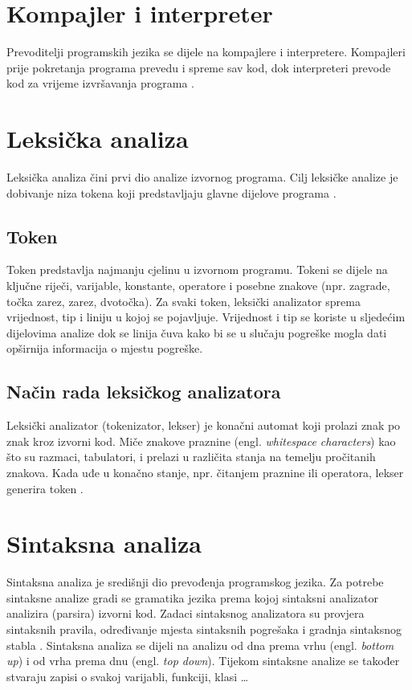 \documentclass[times, utf8, zavrsni]{fer}
\begin{document}
\section{Kompajler i interpreter}
Prevoditelji programskih jezika se dijele na kompajlere i interpretere. Kompajleri prije pokretanja programa prevedu i spreme sav kod, dok interpreteri 
prevode kod za vrijeme izvršavanja programa \citep{compilerint}. 

\section{Leksička analiza}
Leksička analiza čini prvi dio analize izvornog programa. Cilj leksičke analize je dobivanje niza tokena koji predstavljaju glavne dijelove programa \citep{ppj}. 

\subsection{Token}
Token predstavlja najmanju cjelinu u izvornom programu. Tokeni se dijele na ključne riječi, varijable, konstante, operatore i posebne znakove (npr. zagrade, točka zarez, zarez, dvotočka).
Za svaki token, leksički analizator sprema vrijednost, tip i liniju u kojoj se pojavljuje. Vrijednost i tip se koriste u sljedećim dijelovima analize dok se linija čuva kako bi se u slučaju pogreške mogla
dati opširnija informacija o mjestu pogreške.

\subsection{Način rada leksičkog analizatora}
Leksički analizator (tokenizator, lekser) je konačni automat koji prolazi znak po znak kroz izvorni kod. Miče znakove praznine (engl. \textit{whitespace characters}) kao što su razmaci,
tabulatori, i prelazi u različita stanja na temelju pročitanih znakova.
Kada uđe u konačno stanje, npr. čitanjem praznine ili operatora, lekser generira token \citep{ppj}. 

\section{Sintaksna analiza}
Sintaksna analiza je središnji dio prevođenja programskog jezika. Za potrebe sintaksne analize gradi se gramatika jezika prema kojoj sintaksni analizator analizira (parsira) izvorni kod.
Zadaci sintaksnog analizatora su provjera sintaksnih pravila, određivanje mjesta sintaksnih pogrešaka i gradnja sintaksnog stabla \citep{ppj}.  Sintaksna analiza se dijeli na analizu od dna prema vrhu (engl. \textit{bottom up}) i od vrha prema dnu (engl. \textit{top down}). Tijekom sintaksne analize se također stvaraju zapisi o svakoj varijabli, funkciji, klasi \dots
\end{document}
